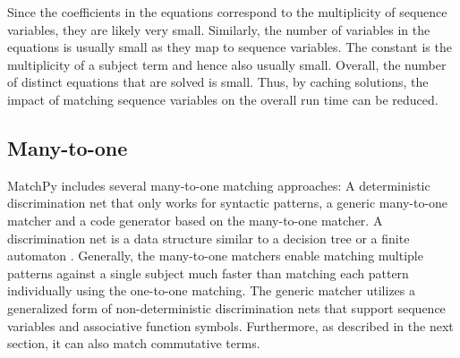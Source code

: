 \documentclass[conference,compsoc]{IEEEtran}
\begin{document}
Since the coefficients in the equations correspond to the multiplicity of sequence variables,
they are likely very small.
Similarly, the number of variables in the equations is usually small as they map to sequence variables.
The constant is the multiplicity of a subject term and hence also usually small.
Overall, the number of distinct equations that are solved is small. Thus, by caching solutions, the impact of matching sequence variables on the overall run time can be reduced.

\subsection{Many-to-one}

MatchPy includes several many-to-one matching approaches: A deterministic discrimination net that only works for syntactic patterns, a generic many-to-one matcher and a code generator based on the many-to-one matcher.
A discrimination net is a data structure similar to a decision tree or a finite automaton \cite{Christian1993,Graef1991,Nedjah1997}.
Generally, the many-to-one matchers enable matching multiple patterns against a single subject much faster than matching each pattern individually using the one-to-one matching.
The generic matcher utilizes a generalized form of non-deterministic discrimination nets that support sequence variables and associative function symbols.
Furthermore, as described in the next section, it can also match commutative terms.
\end{document}
